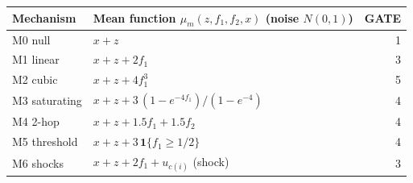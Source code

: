 \begin{tabular}{llr}
\toprule
Mechanism & Mean function $\mu_m(z,f_1,f_2,x)$ (noise $N(0,1)$) & GATE \\
\midrule
M0 null & $x+z$ & 1 \\
M1 linear & $x+z+2f_1$ & 3 \\
M2 cubic & $x+z+4f_1^3$ & 5 \\
M3 saturating & $x+z+3\,(1-e^{-4f_1})/(1-e^{-4})$ & 4 \\
M4 2-hop & $x+z+1.5f_1+1.5f_2$ & 4 \\
M5 threshold & $x+z+3\,\mathbf{1}\{f_1\ge 1/2\}$ & 4 \\
M6 shocks & $x+z+2f_1+u_{c(i)}$ (shock) & 3 \\
\bottomrule
\end{tabular}
